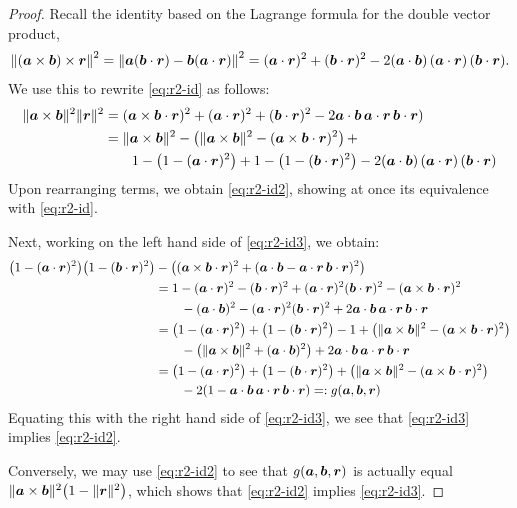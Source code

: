 \begin{proof}
Recall the identity based on the Lagrange formula for the double vector product,
  \begin{align}
    \left\|(\boa\times\bob)\times\bor\right\|^2 = \left\|\boa(\bob\cdot\bor) - \bob(\boa\cdot\bor) \right\|^2%
    = (\boa\cdot\bor)^2 + (\bob\cdot\bor)^2 - 2(\boa\cdot\bob)\,(\boa\cdot\bor)\,(\bob\cdot\bor).
  \end{align}
  We use this to rewrite \eqref{eq:r2-id} as follows:
  \begin{align}
    \|\bm{a}\times\bm{b}\|^2\|\bm{r}\|^2&=(\bm{a}\times\bm{b}\cdot\bm{r})^2+(\bm{a}\cdot\bm{r})^2 + (\bm{b}\cdot\bm{r})^2 - 2\bm{a}\cdot\bm{b}\,\bm{a}\cdot\bm{r}\,\bm{b}\cdot\bm{r})\\
                                  &=\|\bm{a}\times\bm{b}\|^2-\left(\|\bm{a}\times\bm{b}\|^2-(\bm{a}\times\bm{b}\cdot\bm{r})^2\right)+\\&\qquad 1-\left(1-(\bm{a}\cdot\bm{r})^2\right)+1-\left(1-(\bm{b}\cdot\bm{r})^2\right)-2 (\bm{a}\cdot\bm{b})\,(\bm{a}\cdot\bm{r})\,(\bm{b}\cdot\bm{r})\nonumber                                  
  \end{align}
  Upon rearranging terms, we obtain \eqref{eq:r2-id2}, showing at once its equivalence with \eqref{eq:r2-id}.
  
  Next, working on the left hand side of \eqref{eq:r2-id3}, we obtain:
 \begin{align}
 \bigl(1-(\bm{a}\cdot\bm{r})^2\bigr)\bigl(1-(\bm{b}\cdot\bm{r})^2\bigr)&-
   \left((\bm{a}\times\bm{b}\cdot\bm{r})^2+(\bm{a}\cdot\bm{b}-\bm{a}\cdot\bm{r}\,\bm{b}\cdot\bm{r})^2\right)\\
 &=1-(\bm{a}\cdot\bm{r})^2-(\bm{b}\cdot\bm{r})^2+(\bm{a}\cdot\bm{r})^2(\bm{b}\cdot\bm{r})^2-(\bm{a}\times\bm{b}\cdot\bm{r})^2\\ \nonumber&\qquad - (\bm{a}\cdot\bm{b})^2-(\bm{a}\cdot\bm{r})^2(\bm{b}\cdot\bm{r})^2
   +2\bm{a}\cdot\bm{b}\,\bm{a}\cdot\bm{r}\,\bm{b}\cdot\bm{r}\\
 &=\left(1-(\bm{a}\cdot\bm{r})^2\right)+\left(1-(\bm{b}\cdot\bm{r})^2\right)-1+\left(\|\bm{a}\times\bm{b}\|^2-(\bm{a}\times\bm{b}\cdot\bm{r})^2\right)\\ \nonumber&\qquad - \left(\|\bm{a}\times\bm{b}\|^2+(\bm{a}\cdot\bm{b})^2\right)
   +2\bm{a}\cdot\bm{b}\,\bm{a}\cdot\bm{r}\,\bm{b}\cdot\bm{r}\\
 &=\left(1-(\bm{a}\cdot\bm{r})^2\right)+\left(1-(\bm{b}\cdot\bm{r})^2\right)+\left(\|\bm{a}\times\bm{b}\|^2-(\bm{a}\times\bm{b}\cdot\bm{r})^2\right)\\ \nonumber &\qquad - 2(1-\bm{a}\cdot\bm{b}\,\bm{a}\cdot\bm{r}\,\bm{b}\cdot\bm{r})=: g(\bm{a},\bm{b},\bm{r})
 \end{align}
 Equating this with the right hand side of \eqref{eq:r2-id3}, we see that \eqref{eq:r2-id3} implies \eqref{eq:r2-id2}.
 
 Conversely, we may use \eqref{eq:r2-id2} to see that $g(\bm{a},\bm{b},\bm{r})$ is actually equal $\|\bm{a}\times\bm{b}\|^2\bigl(1-\|\bm{r}\|^2\bigr)$, which shows that \eqref{eq:r2-id2} implies
 \eqref{eq:r2-id3}.
\end{proof}
